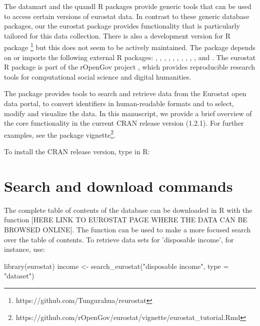 The datamart \citep{datamart} and the quandl
\citep{quandl} R packages provide generic tools that can be used to access
certain versions of eurostat data. In contrast to these generic
database packages, our the eurostat package provides functionality
that is particularly tailored for this data collection. There is also
a development version for R package
\footnote{https://github.com/Tungurahua/reurostat} but this
does not seem to be actively maintained. The package
depends on or imports the following external R packages:
 \citep{devtools},  \citep{dplyr},
 \citep{knitr},  \citep{ggplot2},
 \citep{mapproj},  \citep{plotrix},
 \citep{reshape2}, 
\citep{rmarkdown},  \citep{stringi},
 \citep{testthat}, and 
\citep{tidyr}. The eurostat R package is
part of the rOpenGov project
\citep{Lahti13icml}, which provides reproducible research tools for
computational social science and digital humanities.


The package provides tools to search and retrieve data from the
Eurostat open data portal, to convert identifiers in human-readable
formats and to select, modify and visualize the data. In this
manuscript, we provide a brief overview of the core functionality in
the current CRAN release version (1.2.1). For further examples, see
the package
vignette\footnote{https://github.com/rOpenGov/eurostat/vignette/eurostat\_tutorial.Rmd}.

To install the CRAN release version, type in R:



\section{Search and download commands}

The complete table of contents of the database can be downloaded in R
with the function  [HERE LINK TO EUROSTAT
PAGE WHERE THE DATA CAN BE BROWSED ONLINE]. The
function  can be used to make a more focused
search over the table of contents. To retrieve data sets for
'disposable income', for instance, use:

\begin{example}
library(eurostat)
income <- search_eurostat("disposable income", type = "dataset")
\end{example}


